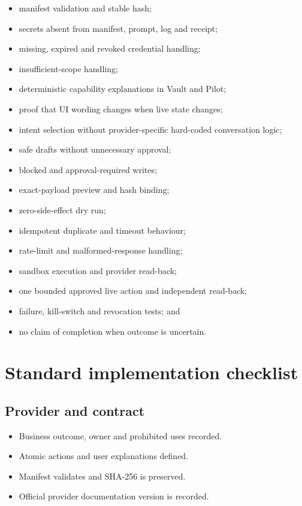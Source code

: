 \documentclass[11pt,a4paper]{article}
\begin{document}
\begin{itemize}
  \item manifest validation and stable hash;
  \item secrets absent from manifest, prompt, log and receipt;
  \item missing, expired and revoked credential handling;
  \item insufficient-scope handling;
  \item deterministic capability explanations in Vault and Pilot;
  \item proof that UI wording changes when live state changes;
  \item intent selection without provider-specific hard-coded conversation logic;
  \item safe drafts without unnecessary approval;
  \item blocked and approval-required writes;
  \item exact-payload preview and hash binding;
  \item zero-side-effect dry run;
  \item idempotent duplicate and timeout behaviour;
  \item rate-limit and malformed-response handling;
  \item sandbox execution and provider read-back;
  \item one bounded approved live action and independent read-back;
  \item failure, kill-switch and revocation tests; and
  \item no claim of completion when outcome is uncertain.
\end{itemize}

\section{Standard implementation checklist}

\subsection*{Provider and contract}
\begin{itemize}
  \item[$\square$] Business outcome, owner and prohibited uses recorded.
  \item[$\square$] Atomic actions and user explanations defined.
  \item[$\square$] Manifest validates and SHA-256 is preserved.
  \item[$\square$] Official provider documentation version is recorded.
\end{itemize}
\end{document}
